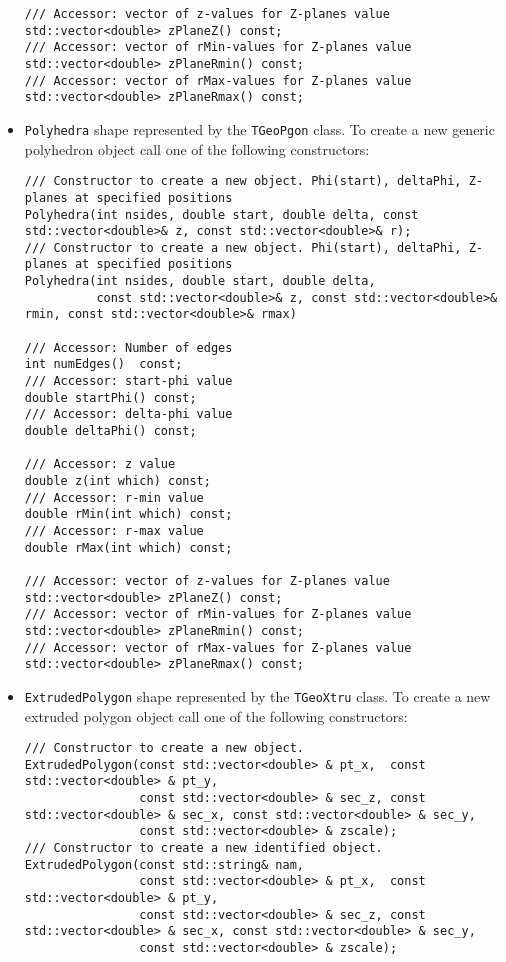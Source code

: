 \begin{itemize}
\begin{verbatim}
/// Accessor: vector of z-values for Z-planes value
std::vector<double> zPlaneZ() const;
/// Accessor: vector of rMin-values for Z-planes value
std::vector<double> zPlaneRmin() const;
/// Accessor: vector of rMax-values for Z-planes value
std::vector<double> zPlaneRmax() const;
\end{verbatim}

\item \texttt{Polyhedra} shape represented by the \texttt{TGeoPgon} class. To create a new generic polyhedron object call one of the following constructors:
\begin{verbatim}
/// Constructor to create a new object. Phi(start), deltaPhi, Z-planes at specified positions
Polyhedra(int nsides, double start, double delta, const std::vector<double>& z, const std::vector<double>& r);
/// Constructor to create a new object. Phi(start), deltaPhi, Z-planes at specified positions
Polyhedra(int nsides, double start, double delta,
          const std::vector<double>& z, const std::vector<double>& rmin, const std::vector<double>& rmax)

/// Accessor: Number of edges
int numEdges()  const;
/// Accessor: start-phi value
double startPhi() const;
/// Accessor: delta-phi value
double deltaPhi() const;

/// Accessor: z value
double z(int which) const;
/// Accessor: r-min value
double rMin(int which) const;
/// Accessor: r-max value
double rMax(int which) const;

/// Accessor: vector of z-values for Z-planes value
std::vector<double> zPlaneZ() const;
/// Accessor: vector of rMin-values for Z-planes value
std::vector<double> zPlaneRmin() const;
/// Accessor: vector of rMax-values for Z-planes value
std::vector<double> zPlaneRmax() const;
\end{verbatim}

\item \texttt{ExtrudedPolygon} shape represented by the \texttt{TGeoXtru} class. To create a new extruded polygon object call one of the following constructors:
\begin{verbatim}
/// Constructor to create a new object. 
ExtrudedPolygon(const std::vector<double> & pt_x,  const std::vector<double> & pt_y,
                const std::vector<double> & sec_z, const std::vector<double> & sec_x, const std::vector<double> & sec_y,
                const std::vector<double> & zscale);
/// Constructor to create a new identified object. 
ExtrudedPolygon(const std::string& nam,
                const std::vector<double> & pt_x,  const std::vector<double> & pt_y,
                const std::vector<double> & sec_z, const std::vector<double> & sec_x, const std::vector<double> & sec_y,
                const std::vector<double> & zscale);


\end{verbatim}
\end{itemize}
